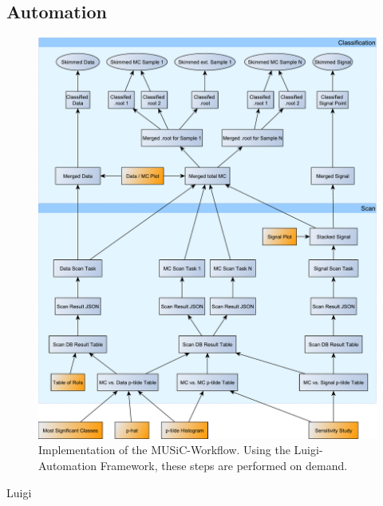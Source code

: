 \subsection{Automation}
\begin{figure}
    \centering
    \includegraphics[width=\textwidth]{../music-workflow}
    \vspace{0.5em}
    \caption{Implementation of the MUSiC-Workflow. Using the Luigi-Automation Framework, these steps are performed on demand.}
    \label{fig:music_workflow}
\end{figure}

Luigi